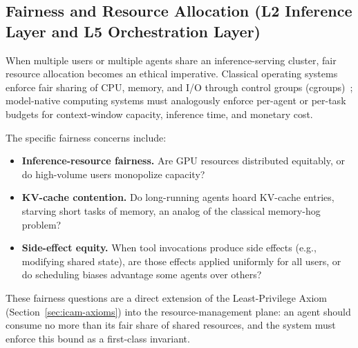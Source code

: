 \subsection{Fairness and Resource Allocation (L2 Inference Layer and L5 Orchestration Layer)}
\label{sec:ethics-fairness}

When multiple users or multiple agents share an inference-serving cluster, fair resource allocation becomes an ethical imperative.  Classical operating systems enforce fair sharing of CPU, memory, and I/O through control groups (cgroups)~\cite{linux_cgroup_2026}; model-native computing systems must analogously enforce per-agent or per-task budgets for context-window capacity, inference time, and monetary cost.

The specific fairness concerns include:

\begin{itemize}[nosep]
\item \textbf{Inference-resource fairness.}  Are GPU resources distributed equitably, or do high-volume users monopolize capacity?
\item \textbf{KV-cache contention.}  Do long-running agents hoard KV-cache entries, starving short tasks of memory, an analog of the classical memory-hog problem?
\item \textbf{Side-effect equity.}  When tool invocations produce side effects (e.g., modifying shared state), are those effects applied uniformly for all users, or do scheduling biases advantage some agents over others?
\end{itemize}

These fairness questions are a direct extension of the Least-Privilege Axiom (Section~\ref{sec:icam-axioms}) into the resource-management plane: an agent should consume no more than its fair share of shared resources, and the system must enforce this bound as a first-class invariant.

